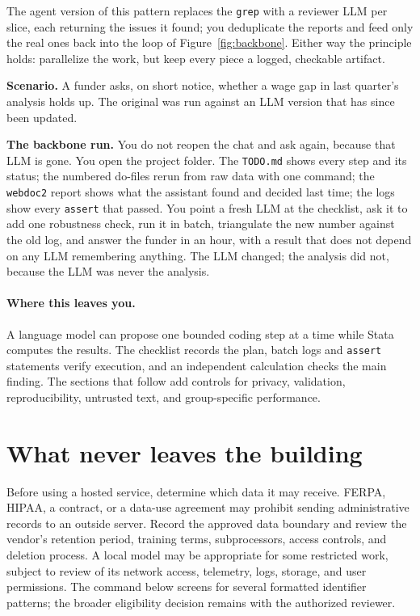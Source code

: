 \documentclass[
    a4paper,
    fontsize=10pt,
    twoside=true,
    numbers=noenddot,
]{kaobook}
\newcounter{appliedexample}
\newenvironment{appliedexample}[1][]{%
    \refstepcounter{appliedexample}%
    \begin{appliedexamplebox}[frametitle={Applied Example~\theappliedexample.~~#1}]%
}{%
    \end{appliedexamplebox}%
}
\begin{document}
The agent version of this pattern replaces the \texttt{grep} with a reviewer LLM per slice, each returning the issues it found; you deduplicate the reports and feed only the real ones back into the loop of Figure~\ref{fig:backbone}. Either way the principle holds: parallelize the work, but keep every piece a logged, checkable artifact.

\begin{appliedexample}[A one-hour reanalysis that survives the LLM changing]\label{ae:ch13-reanalysis}
\textbf{Scenario.} A funder asks, on short notice, whether a wage gap in last quarter's analysis holds up. The original was run against an LLM version that has since been updated.

\medskip
\textbf{The backbone run.} You do not reopen the chat and ask again, because that LLM is gone. You open the project folder. The \texttt{TODO.md} shows every step and its status; the numbered do-files rerun from raw data with one command; the \texttt{webdoc2} report shows what the assistant found and decided last time; the logs show every \texttt{assert} that passed. You point a fresh LLM at the checklist, ask it to add one robustness check, run it in batch, triangulate the new number against the old log, and answer the funder in an hour, with a result that does not depend on any LLM remembering anything. The LLM changed; the analysis did not, because the LLM was never the analysis.
\end{appliedexample}

\paragraph{Where this leaves you.} A language model can propose one bounded coding step at a time while Stata computes the results. The checklist records the plan, batch logs and \texttt{assert} statements verify execution, and an independent calculation checks the main finding. The sections that follow add controls for privacy, validation, reproducibility, untrusted text, and group-specific performance.

\section{What never leaves the building}
Before using a hosted service, determine which data it may receive. FERPA, HIPAA, a contract, or a data-use agreement may prohibit sending administrative records to an outside server. Record the approved data boundary and review the vendor's retention period, training terms, subprocessors, access controls, and deletion process. A local model may be appropriate for some restricted work, subject to review of its network access, telemetry, logs, storage, and user permissions. The command below screens for several formatted identifier patterns; the broader eligibility decision remains with the authorized reviewer.
\end{document}
